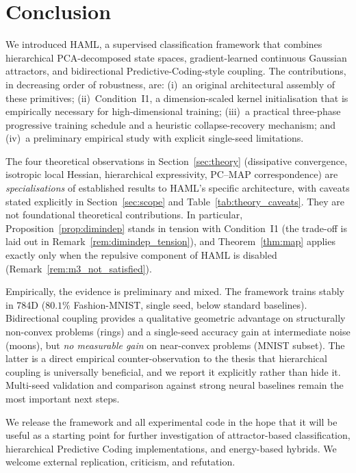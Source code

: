 \documentclass[11pt,a4paper]{article}
\begin{document}
\section{Conclusion}

We introduced HAML, a supervised classification framework that combines hierarchical
PCA-decomposed state spaces, gradient-learned continuous Gaussian attractors, and
bidirectional Predictive-Coding-style coupling. The contributions, in decreasing order
of robustness, are: (i)~an original architectural assembly of these primitives;
(ii)~Condition~I1, a dimension-scaled kernel initialisation that is empirically
necessary for high-dimensional training; (iii)~a practical three-phase progressive
training schedule and a heuristic collapse-recovery mechanism; and (iv)~a preliminary
empirical study with explicit single-seed limitations.

The four theoretical observations in Section~\ref{sec:theory} (dissipative convergence,
isotropic local Hessian, hierarchical expressivity, PC--MAP correspondence) are
\emph{specialisations} of established results to HAML's specific architecture, with
caveats stated explicitly in Section~\ref{sec:scope} and Table~\ref{tab:theory_caveats}.
They are not foundational theoretical contributions. In particular,
Proposition~\ref{prop:dimindep} stands in tension with Condition~I1 (the trade-off is
laid out in Remark~\ref{rem:dimindep_tension}), and Theorem~\ref{thm:map} applies
exactly only when the repulsive component of HAML is disabled
(Remark~\ref{rem:m3_not_satisfied}).

Empirically, the evidence is preliminary and mixed. The framework trains stably in 784D
($80.1\%$ Fashion-MNIST, single seed, below standard baselines). Bidirectional coupling
provides a qualitative geometric advantage on structurally non-convex problems (rings)
and a single-seed accuracy gain at intermediate noise (moons), but \emph{no measurable
gain} on near-convex problems (MNIST subset). The latter is a direct empirical
counter-observation to the thesis that hierarchical coupling is universally beneficial,
and we report it explicitly rather than hide it. Multi-seed validation and comparison
against strong neural baselines remain the most important next steps.

We release the framework and all experimental code in the hope that it will be useful
as a starting point for further investigation of attractor-based classification,
hierarchical Predictive Coding implementations, and energy-based hybrids. We welcome
external replication, criticism, and refutation.
\end{document}
